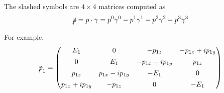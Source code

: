 \documentclass[12pt]{article}
\begin{document}
The slashed symbols are $4\times4$ matrices computed as
\begin{equation*}
\slashed{p}=p\cdot\gamma
=p^0\gamma^0-p^1\gamma^1-p^2\gamma^2-p^3\gamma^3
\end{equation*}

For example,
\begin{equation*}
\slashed{p}_1=\begin{pmatrix}
E_1 & 0 & -p_{1z} & -p_{1x} + ip_{1y}
\\[1ex]
0 & E_1 & -p_{1x} - ip_{1y} & p_{1z}
\\[1ex]
p_{1z} & p_{1x} - i p_{1y} & -E_1 & 0
\\[1ex]
p_{1x} + ip_{1y} & -p_{1z} & 0 & -E_1
\end{pmatrix}
\end{equation*}
\end{document}
